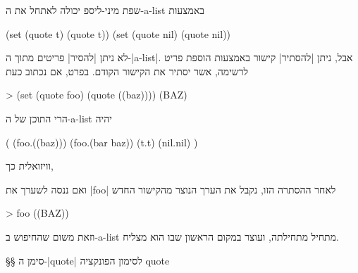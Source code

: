 שפת מיני-ליספ יכולה לאתחל את ה-a-list באמצעות
\begin{LIBRARY}
(set (quote t) (quote t))
(set (quote nil) (quote nil))
\end{LIBRARY}
לא ניתן \ע|להסיר| פריטים מתוך ה-\E|a-list|. אבל, ניתן \ע|להסתיר| קישור באמצעות
הוספת פריט לרשימה, אשר יסתיר את הקישור הקודם. בפרט, אם נכתוב כעת
\begin{LISP}
> (set (quote foo) (quote ((baz))))
(BAZ)
\end{LISP}
הרי התוכן של ה-a-list יהיה
\begin{LISP}
(
  (foo.((baz)))
  (foo.(bar baz))
  (t.t)
  (nil.nil)
)
\end{LISP}
וויזואלית כך,
\begin{LTR}
\end{LTR}
ואם ננסה לשערך את \T|foo| לאחר ההסתרה הזו, נקבל את הערך הנוצר מהקישור החדש
\begin{LISP}
> foo
((BAZ))
\end{LISP}
וזאת משום שהחיפוש ב-a-list מתחיל מתחילתה, ועוצר במקום הראשון שבו הוא מצליח.

§§ סימן ה-\E|quote| לסימון הפונקציה quote

